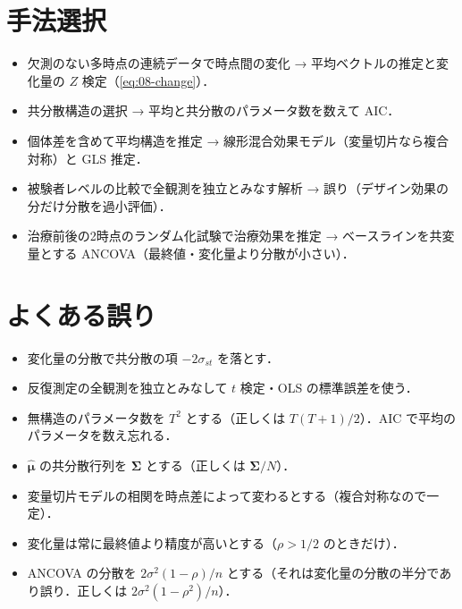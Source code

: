 \section{手法選択}\label{sec:08-choice}
\begin{itemize}
\item 欠測のない多時点の連続データで時点間の変化 → 平均ベクトルの推定と変化量の $Z$ 検定（\cref{eq:08-change}）．
\item 共分散構造の選択 → 平均と共分散のパラメータ数を数えて AIC．
\item 個体差を含めて平均構造を推定 → 線形混合効果モデル（変量切片なら複合対称）と GLS 推定．
\item 被験者レベルの比較で全観測を独立とみなす解析 → 誤り（デザイン効果の分だけ分散を過小評価）．
\item 治療前後の2時点のランダム化試験で治療効果を推定 → ベースラインを共変量とする ANCOVA（最終値・変化量より分散が小さい）．
\end{itemize}

\section{よくある誤り}\label{sec:08-err}
\begin{warnbox}
\begin{itemize}
\item 変化量の分散で共分散の項 $-2\sigma_{st}$ を落とす．
\item 反復測定の全観測を独立とみなして $t$ 検定・OLS の標準誤差を使う．
\item 無構造のパラメータ数を $T^2$ とする（正しくは $T(T+1)/2$）．AIC で平均のパラメータを数え忘れる．
\item $\hat{\bm\mu}$ の共分散行列を $\bm\Sigma$ とする（正しくは $\bm\Sigma/N$）．
\item 変量切片モデルの相関を時点差によって変わるとする（複合対称なので一定）．
\item 変化量は常に最終値より精度が高いとする（$\rho>1/2$ のときだけ）．
\item ANCOVA の分散を $2\sigma^2(1-\rho)/n$ とする（それは変化量の分散の半分であり誤り．正しくは $2\sigma^2(1-\rho^2)/n$）．
\end{itemize}
\end{warnbox}


